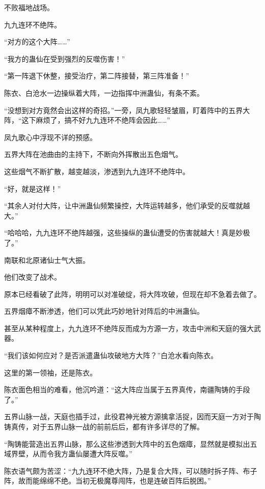 
\begin{this_body}

不败福地战场。

九九连环不绝阵。

“对方的这个大阵……”

“我方的蛊仙在受到强烈的反噬伤害！”

“第一阵退下休整，接受治疗，第二阵接替，第三阵准备！”

陈衣、白沧水一边操纵着大阵，一边指挥中洲蛊仙，有条不紊。

“没想到对方竟然会出这样的奇招。”一旁，凤九歌轻轻皱眉，盯着阵中的五界大阵，“这下麻烦了，搞不好九九连环不绝阵会因此……”

凤九歌心中浮现不详的预感。

五界大阵在池曲由的主持下，不断向外挥散出五色烟气。

这些烟气不断扩散，越变越淡，渗透到九九连环不绝阵中。

“好，就是这样！”

“其余人对付大阵，让中洲蛊仙频繁操控，大阵运转越多，他们承受的反噬就越大。”

“哈哈哈，九九连环不绝阵越强，这些操纵的蛊仙遭受的伤害就越大！真是妙极了。”

南联和北原诸仙士气大振。

他们改变了战术。

原本已经看破了此阵，明明可以对准破绽，将大阵攻破，但现在却不急着去做了。

五界烟瘴不断渗透，他们可以凭此巧妙地针对阵后的中洲蛊仙。

甚至从某种程度上，九九连环不绝阵反而成为方源一方，攻击中洲和天庭的强大武器。

“我们该如何应对？是否派遣蛊仙攻破地方大阵？”白沧水看向陈衣。

这里的第一领袖，还是陈衣。

陈衣面色相当的难看，他沉吟道：“这大阵应当属于五界真传，南疆陶铸的手段了。”

五界山脉一战，天庭也插手过，此役君神光被方源擒拿活捉，因而天庭一方对于陶铸真传，对于五界山脉一战的前前后后，都有许多详尽的了解。

“陶铸能营造出五界山脉，那么这些渗透到大阵中的五色烟瘴，显然就是模拟出五域界壁，从而令我方蛊仙屡遭大阵反噬。”

陈衣语气颇为苦涩：“九九连环不绝大阵，乃是复合大阵，可以随时拆子阵、布子阵，故而能绵绵不绝。当初无极魔尊闯阵，也是连破百阵后脱困。”


\end{this_body}
